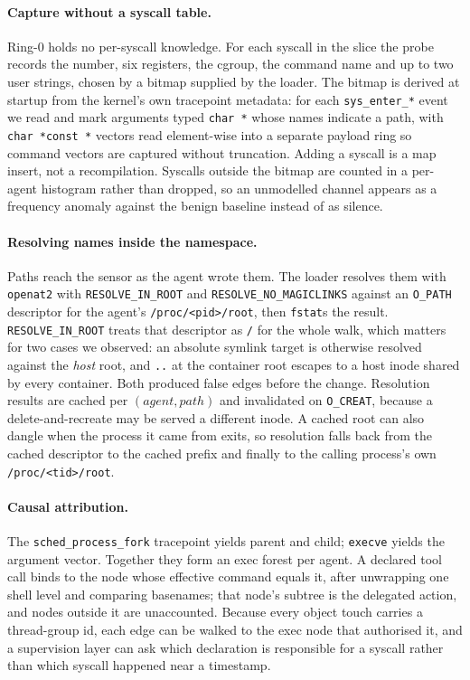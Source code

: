 \documentclass[11pt]{article}
\begin{document}
\paragraph{Capture without a syscall table.} Ring-0 holds no per-syscall
knowledge. For each syscall in the slice the probe records the number, six
registers, the cgroup, the command name and up to two user strings, chosen by a
bitmap supplied by the loader. The bitmap is derived at startup from the kernel's
own tracepoint metadata: for each \texttt{sys\_enter\_*} event we read
 and mark arguments typed
\texttt{char~*} whose names indicate a path, with \texttt{char~*const~*} vectors
read element-wise into a separate payload ring so command vectors are captured
without truncation. Adding a syscall is a map insert, not a recompilation.
Syscalls outside the bitmap are counted in a per-agent histogram rather than
dropped, so an unmodelled channel appears as a frequency anomaly against the
benign baseline instead of as silence.

\paragraph{Resolving names inside the namespace.} Paths reach the sensor as the
agent wrote them. The loader resolves them with \texttt{openat2} with
\texttt{RESOLVE\_IN\_ROOT} and \texttt{RESOLVE\_NO\_MAGICLINKS} against an
\texttt{O\_PATH} descriptor for the agent's \texttt{/proc/<pid>/root}, then
\texttt{fstat}s the result. \texttt{RESOLVE\_IN\_ROOT} treats that descriptor as
\texttt{/} for the whole walk, which matters for two cases we observed: an
absolute symlink target is otherwise resolved against the \emph{host} root, and
\texttt{..} at the container root escapes to a host inode shared by every
container. Both produced false edges before the change. Resolution results are
cached per $(\mathit{agent},\mathit{path})$ and invalidated on \texttt{O\_CREAT},
because a delete-and-recreate may be served a different inode. A cached root can
also dangle when the process it came from exits, so resolution falls back from the
cached descriptor to the cached prefix and finally to the calling process's own
\texttt{/proc/<tid>/root}.

\paragraph{Causal attribution.} The \texttt{sched\_process\_fork} tracepoint
yields parent and child; \texttt{execve} yields the argument vector. Together they
form an exec forest per agent. A declared tool call binds to the node whose
effective command equals it, after unwrapping one shell level and comparing
basenames; that node's subtree is the delegated action, and nodes outside it are
unaccounted. Because every object touch carries a thread-group id, each edge can
be walked to the exec node that authorised it, and a supervision layer can ask
which declaration is responsible for a syscall rather than which syscall happened
near a timestamp.
\end{document}
